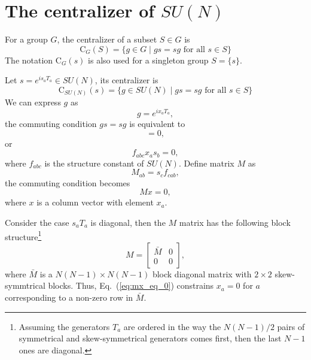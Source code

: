 \documentclass{article}
\begin{document}
\section{The centralizer of $SU(N)$}
For a group $G$, the centralizer of a subset $S\in G$ is
\begin{equation}
  \text{C}_G(S) = \{g\in G\mid gs = sg \text{ for all } s\in S\}
\end{equation}
The notation $\text{C}_G(s)$ is also used for a singleton group
$S = \{s\}$.

Let $s = e^{is_aT_a}\in SU(N)$, its centralizer is
\begin{equation}
  \text{C}_{SU(N)}(s) = \{g\in SU(N) \mid gs=sg \text{ for all } s\in S\}
\end{equation}
We can express $g$ as
\begin{equation}
  g = e^{ix_aT_a},
\end{equation}
the commuting condition $gs = sg$ is equivalent to
\begin{equation}
  [x_aT_a, s_bT_b ] = 0,
\end{equation}
or
\begin{equation}
  f_{abc}x_as_b = 0,
\end{equation}
where $f_{abc}$ is the structure constant of $SU(N)$.  Define matrix
$M$ as
\begin{equation}
  M_{ab} = s_cf_{cab},
\end{equation}
the commuting condition becomes
\begin{equation}
  \label{eq:mx_eq_0}
  Mx = 0,
\end{equation}
where $x$ is a column vector with element $x_a$.

Consider the case $s_aT_a$ is diagonal,  then the $M$ matrix
has the following block structure\footnote{Assuming the generators $T_a$
are ordered in the way the $N(N-1)/2$ pairs of symmetrical and
skew-symmetrical generators comes first, then the last $N-1$
ones are diagonal.}
\begin{equation}
  M = \begin{bmatrix} \bar M & 0 \\ 0 & 0\end{bmatrix},
\end{equation}
where $\bar M$ is a $N(N-1)\times N(N-1)$ block diagonal matrix with
$2\times2$ skew-symmtrical blocks.  Thus, Eq.~(\ref{eq:mx_eq_0})
constrains $x_a = 0$ for $a$ corresponding to a non-zero row in
$\bar M$.



\end{document}
